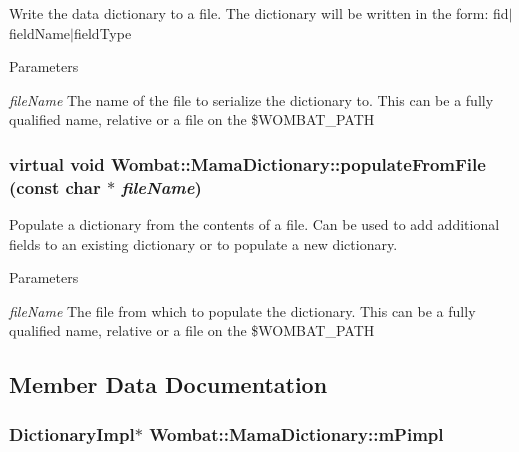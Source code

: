 Write the data dictionary to a file. The dictionary will be written in the form: fid$|$fieldName$|$fieldType


\begin{DoxyParams}{Parameters}
\item[{\em fileName}]The name of the file to serialize the dictionary to. This can be a fully qualified name, relative or a file on the \$WOMBAT\_\-PATH \end{DoxyParams}
\hypertarget{classWombat_1_1MamaDictionary_a44e10e3e54d0f58471ec0e457b05442d}{
\subsubsection[{populateFromFile}]{\setlength{\rightskip}{0pt plus 5cm}virtual void Wombat::MamaDictionary::populateFromFile (const char $\ast$ {\em fileName})}}
\label{classWombat_1_1MamaDictionary_a44e10e3e54d0f58471ec0e457b05442d}


Populate a dictionary from the contents of a file. Can be used to add additional fields to an existing dictionary or to populate a new dictionary.


\begin{DoxyParams}{Parameters}
\item[{\em fileName}]The file from which to populate the dictionary. This can be a fully qualified name, relative or a file on the \$WOMBAT\_\-PATH \end{DoxyParams}


\subsection{Member Data Documentation}
\hypertarget{classWombat_1_1MamaDictionary_a1bf6c56a35c388b96f0943fbe3462364}{
\subsubsection[{mPimpl}]{\setlength{\rightskip}{0pt plus 5cm}DictionaryImpl$\ast$ {\bf Wombat::MamaDictionary::mPimpl}}}
\label{classWombat_1_1MamaDictionary_a1bf6c56a35c388b96f0943fbe3462364}
